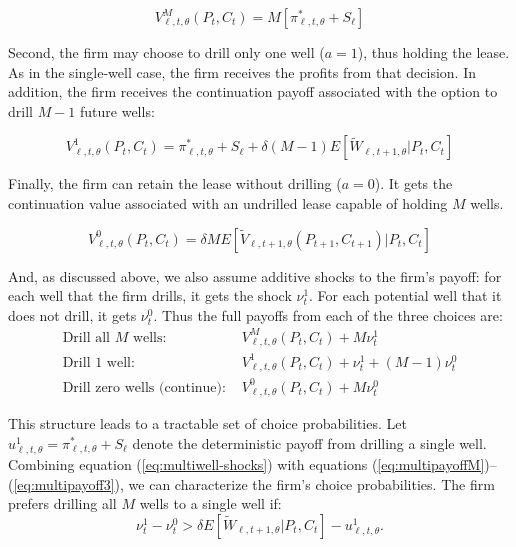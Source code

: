 \documentclass[12pt]{article}
\begin{document}
\begin{equation}
V^M_{\ell,t,\theta}(P_t,C_t) = M [\pi^*_{\ell,t,\theta} + S_{\ell} ] \label{eq:multipayoffM}
\end{equation}

Second, the firm may choose to drill only one well ($a = 1$), thus holding the lease. As in the single-well case, the firm receives the profits from that decision. In addition, the firm receives the continuation payoff associated with the option to drill $M - 1 $ future wells:

\begin{equation}
V^1_{\ell,t,\theta}(P_t,C_t) = \pi^*_{\ell,t,\theta} + S_{\ell} + \delta  (M - 1) E[\tilde{W}_{\ell,t+1,\theta}|P_t,C_t]
\label{eq:multipayoff1}
\end{equation}

Finally, the firm can retain the lease without drilling ($a = 0$). It gets the continuation value associated with an undrilled lease capable of holding $M$ wells.

\begin{equation}
V^0_{\ell,t,\theta}(P_t,C_t) = \delta M E[\tilde{V}_{\ell,t+1,\theta}(P_{t+1},C_{t+1})|P_t,C_t] \label{eq:multipayoff3}
\end{equation}

And, as discussed above, we also assume additive shocks to the firm's payoff: for each well that the firm drills, it gets the shock $\nu^1_t$.  For each potential well that it does not drill, it gets $\nu^0_t$. Thus the full payoffs from each of the three choices are:
\begin{equation}
\begin{aligned}
\mbox{Drill all $M$ wells:                 } & V^M_{\ell,t,\theta}(P_t,C_t)  + M \nu^1_t \\
\mbox{Drill 1 well:                 }                               & V^1_{\ell,t,\theta}(P_t,C_t)  + \nu^1_t + (M - 1) \nu^0_t \\
\mbox{Drill zero wells (continue):      } & V^0_{\ell,t,\theta}(P_t,C_t)  + M  \nu^0_t
\end{aligned}\label{eq:multiwell-shocks}
\end{equation}

This structure leads to a tractable set of choice probabilities. Let $u^1_{\ell,t,\theta} = \pi^*_{\ell,t,\theta} + S_{\ell}$ denote the deterministic payoff from drilling a single well.  Combining equation (\ref{eq:multiwell-shocks}) with equations (\ref{eq:multipayoffM})--(\ref{eq:multipayoff3}), we can characterize the firm's choice probabilities. The firm prefers drilling all $M$ wells to a single well if:
\begin{equation}
\nu^1_t - \nu^0_t > \delta E[\tilde{W}_{\ell,t+1,\theta}|P_t,C_t] - u^1_{\ell,t,\theta}.
\end{equation}
\end{document}

